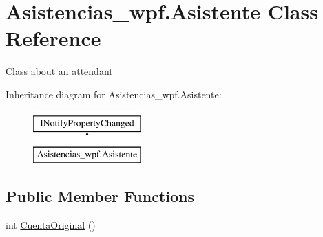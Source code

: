 \hypertarget{class_asistencias__wpf_1_1_asistente}{\section{Asistencias\-\_\-wpf.\-Asistente Class Reference}
\label{class_asistencias__wpf_1_1_asistente}
}


Class about an attendant  


Inheritance diagram for Asistencias\-\_\-wpf.\-Asistente\-:\begin{figure}[H]
\begin{center}
\leavevmode
\includegraphics[height=2.000000cm]{d8/dfa/class_asistencias__wpf_1_1_asistente}
\end{center}
\end{figure}
\subsection*{Public Member Functions}
\begin{DoxyCompactItemize}
\item 
int \hyperlink{class_asistencias__wpf_1_1_asistente_a0b2aea45dc518be02f9f506176993342}{Cuenta\-Original} ()
\end{DoxyCompactItemize}
